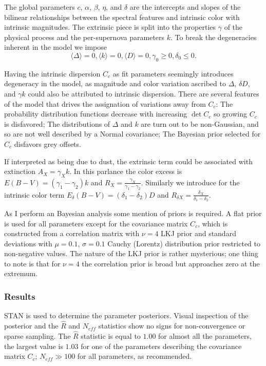 \documentclass[11pt, oneside]{article}   	%
\begin{document}
The global parameters $c$, $\alpha$, $\beta$, $\eta$, and $\delta$  are the intercepts and slopes of the bilinear relationships between the spectral
features and intrinsic color with intrinsic magnitudes.  The extrinsic piece is split into the properties $\gamma$ of the physical process and the per-supernova 
parameters $k$.  To break the degeneracies inherent in the model we impose
\begin{equation*}
\langle \Delta \rangle=0, \langle k \rangle=0, \langle D \rangle=0, \gamma_0 \ge 0, \delta_0\le0.
\end{equation*}

Having the intrinsic dispersion $C_c$ as fit parameters seemingly introduces degeneracy in the model, as magnitude and color variation
ascribed to $\Delta$, $\delta D$, and $\gamma k$ could also be attributed to intrinsic dispersion.  There are several features of the model
that drives the assignation of variations away from $C_c$:  The probability distribution functions decrease
with increasing $\det{C_c}$ so growing $C_c$ is disfavored; The distributions of $\Delta$ and $k$ are turn out to
be non-Gaussian, and so are not well described by a Normal covariance; The Bayesian prior selected for $C_c$ disfavors
grey offsets.

If interpreted as being due to dust, the extrinsic term could be associated with extinction $A_X = \gamma_X k$.  In
this parlance the color excess
is $E(B-V) = (\gamma_1-\gamma_2) k$ and $R_X = \frac{\gamma_X}{\gamma_1-\gamma_2}$.
Similarly we introduce for the intrinsic color term $E_\delta(B-V) = (\delta_1-\delta_2) D$ and $R_{\delta X} = \frac{\delta_X}{\delta_1-\delta_2}$.

As I perform an Bayesian analysis some mention of priors is required.  A flat prior is used for all parameters except
for the covariance matrix $C_c$, which is constructed from a correlation matrix with  $\nu=4$  LKJ prior and standard
deviations with
 $\mu=0.1 $, $\sigma=0.1$ Cauchy (Lorentz) distribution prior restricted to non-negative values.
The nature of the LKJ prior is rather mysterious; one thing to note is that for $\nu=4$ the correlation prior is broad but
approaches zero at the extremum.

\subsubsection{Results}
STAN is used to determine the parameter posteriors.  Visual inspection of the posterior and the $\hat{R}$ and $N_{eff}$ statistics
show no signs for non-convergence or sparse sampling.
The $\hat{R}$ statistic is equal to $1.00$ for almost all the parameters, the largest value is $1.03$ for one of the parameters describing the covariance matrix $C_c$;  $N_{eff} \gg 100$ for all parameters, as recommended.
\end{document}
